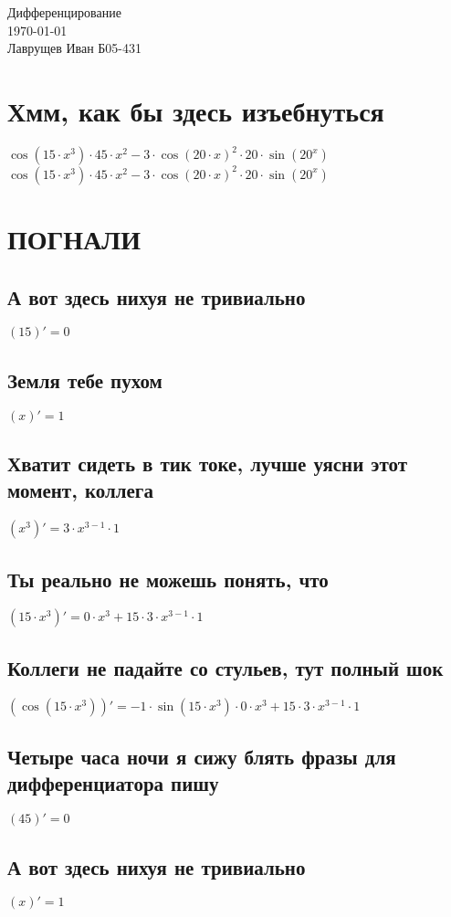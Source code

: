 \documentclass[12pt]{article}
\begin{document}
\begingroup
    \centering
    \LARGE Дифференцирование\\
    \large \today \\[0.5em]
    \large Лаврущев Иван Б05-431\par
\endgroup
\tableofcontents
\section{Хмм, как бы здесь изъебнуться}
$\cos(15 \cdot x^{3}) \cdot 45 \cdot x^{2} - 3 \cdot \cos(20 \cdot x)^{2} \cdot 20 \cdot \sin(20^{x})$\\
$\cos(15 \cdot x^{3}) \cdot 45 \cdot x^{2} - 3 \cdot \cos(20 \cdot x)^{2} \cdot 20 \cdot \sin(20^{x})$\\
\section{ПОГНАЛИ}
\subsection{А вот здесь нихуя не тривиально}
$(15)' = 0$
\subsection{Земля тебе пухом}
$(x)' = 1$
\subsection{Хватит сидеть в тик токе, лучше уясни этот момент, коллега}
$(x^{3})' = 3 \cdot x^{3 - 1} \cdot 1$
\subsection{Ты реально не можешь понять, что}
$(15 \cdot x^{3})' = 0 \cdot x^{3} + 15 \cdot 3 \cdot x^{3 - 1} \cdot 1$
\subsection{Коллеги не падайте со стульев, тут полный шок}
$(\cos(15 \cdot x^{3}))' = -1 \cdot \sin(15 \cdot x^{3}) \cdot 0 \cdot x^{3} + 15 \cdot 3 \cdot x^{3 - 1} \cdot 1$
\subsection{Четыре часа ночи я сижу блять фразы для дифференциатора пишу}
$(45)' = 0$
\subsection{А вот здесь нихуя не тривиально}
$(x)' = 1$
\end{document}
